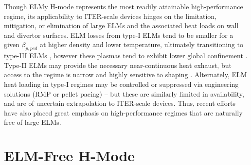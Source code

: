 Though ELMy H-mode represents the most readily attainable high-performance regime, its applicability to ITER-scale devices hinges on the limitation, mitigation, or elimination of large ELMs and the associated heat loads on wall and divertor surfaces.  ELM losses from type-I ELMs tend to be smaller for a given $\beta_{p,ped}$ at higher density and lower temperature, ultimately transitioning to type-III ELMs \cite{Urano2003}, however these plasmas tend to exhibit lower global confinement \cite{Saibene1999}.  Type-II ELMs may provide the necessary near-continuous heat exhaust, but access to the regime is narrow and highly sensitive to shaping \cite{Suttrop2003}.  Alternately, ELM heat loading in type-I regimes may be controlled or suppressed via engineering solutions (\ie RMP or pellet pacing) -- but these are similarly limited in availability, and are of uncertain extrapolation to ITER-scale devices.  Thus, recent efforts have also placed great emphasis on high-performance regimes that are naturally free of 
large ELMs.\nicesectionending

\section{ELM-Free H-Mode}\label{sec:hcr_elmfree}

